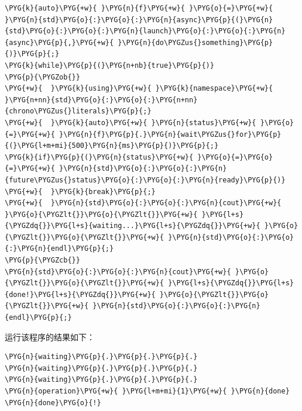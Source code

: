 \begin{codeblockbg}
\begin{Verbatim}[commandchars=\\\{\},breaklines=true,breakanywhere=true,fontsize=\codefont,xleftmargin=17bp]
\PYG{k}{auto}\PYG{+w}{ }\PYG{n}{f}\PYG{+w}{ }\PYG{o}{=}\PYG{+w}{ }\PYG{n}{std}\PYG{o}{:}\PYG{o}{:}\PYG{n}{async}\PYG{p}{(}\PYG{n}{std}\PYG{o}{:}\PYG{o}{:}\PYG{n}{launch}\PYG{o}{:}\PYG{o}{:}\PYG{n}{async}\PYG{p}{,}\PYG{+w}{ }\PYG{n}{do\PYGZus{}something}\PYG{p}{)}\PYG{p}{;}
\PYG{k}{while}\PYG{p}{(}\PYG{n+nb}{true}\PYG{p}{)}
\PYG{p}{\PYGZob{}}
\PYG{+w}{  }\PYG{k}{using}\PYG{+w}{ }\PYG{k}{namespace}\PYG{+w}{ }\PYG{n+nn}{std}\PYG{o}{:}\PYG{o}{:}\PYG{n+nn}{chrono\PYGZus{}literals}\PYG{p}{;}
\PYG{+w}{  }\PYG{k}{auto}\PYG{+w}{ }\PYG{n}{status}\PYG{+w}{ }\PYG{o}{=}\PYG{+w}{ }\PYG{n}{f}\PYG{p}{.}\PYG{n}{wait\PYGZus{}for}\PYG{p}{(}\PYG{l+m+mi}{500}\PYG{n}{ms}\PYG{p}{)}\PYG{p}{;}
\PYG{k}{if}\PYG{p}{(}\PYG{n}{status}\PYG{+w}{ }\PYG{o}{=}\PYG{o}{=}\PYG{+w}{ }\PYG{n}{std}\PYG{o}{:}\PYG{o}{:}\PYG{n}{future\PYGZus{}status}\PYG{o}{:}\PYG{o}{:}\PYG{n}{ready}\PYG{p}{)}
\PYG{+w}{  }\PYG{k}{break}\PYG{p}{;}
\PYG{+w}{  }\PYG{n}{std}\PYG{o}{:}\PYG{o}{:}\PYG{n}{cout}\PYG{+w}{ }\PYG{o}{\PYGZlt{}}\PYG{o}{\PYGZlt{}}\PYG{+w}{ }\PYG{l+s}{\PYGZdq{}}\PYG{l+s}{waiting...}\PYG{l+s}{\PYGZdq{}}\PYG{+w}{ }\PYG{o}{\PYGZlt{}}\PYG{o}{\PYGZlt{}}\PYG{+w}{ }\PYG{n}{std}\PYG{o}{:}\PYG{o}{:}\PYG{n}{endl}\PYG{p}{;}
\PYG{p}{\PYGZcb{}}
\PYG{n}{std}\PYG{o}{:}\PYG{o}{:}\PYG{n}{cout}\PYG{+w}{ }\PYG{o}{\PYGZlt{}}\PYG{o}{\PYGZlt{}}\PYG{+w}{ }\PYG{l+s}{\PYGZdq{}}\PYG{l+s}{done!}\PYG{l+s}{\PYGZdq{}}\PYG{+w}{ }\PYG{o}{\PYGZlt{}}\PYG{o}{\PYGZlt{}}\PYG{+w}{ }\PYG{n}{std}\PYG{o}{:}\PYG{o}{:}\PYG{n}{endl}\PYG{p}{;}
\end{Verbatim}
\end{codeblockbg}



运行该程序的结果如下：



\begin{codeblockbg}
\begin{Verbatim}[commandchars=\\\{\},breaklines=true,breakanywhere=true,fontsize=\codefont,xleftmargin=17bp]
\PYG{n}{waiting}\PYG{p}{.}\PYG{p}{.}\PYG{p}{.}
\PYG{n}{waiting}\PYG{p}{.}\PYG{p}{.}\PYG{p}{.}
\PYG{n}{waiting}\PYG{p}{.}\PYG{p}{.}\PYG{p}{.}
\PYG{n}{operation}\PYG{+w}{ }\PYG{l+m+mi}{1}\PYG{+w}{ }\PYG{n}{done}
\PYG{n}{done}\PYG{o}{!}
\end{Verbatim}
\end{codeblockbg}


